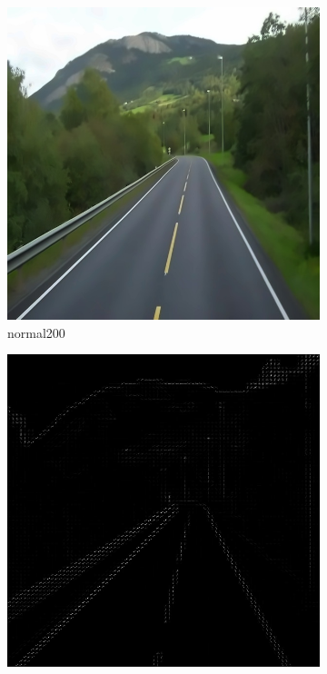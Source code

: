 \documentclass[a4paper, 10pt]{article}
\begin{document}
\begin{figure}[htbp]
		\begin{subfigure}{0.24\textwidth}
			\includegraphics[width=\linewidth]{picture/alldata/normal200}
			\caption{normal200}
			\label{fig: normal200}	
		\end{subfigure}
		\begin{subfigure}{0.24\textwidth}
			\includegraphics[width=\linewidth]{picture/alldata_hog/normal200}

\end{subfigure}
\end{figure}
\end{document}
